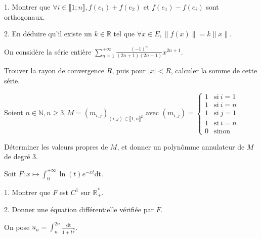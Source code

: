 \vspace{5pt}
1. Montrer que $\forall i \in \llbracket 1; n \rrbracket, f(e_1) + f(e_2)$ et $f(e_1) - f(e_i)$ sont orthogonaux.

\vspace{5pt}
2. En déduire qu'il existe un $k \in \mathbb{R}$ tel que $\forall x \in E, \| f(x) \| = k \|x\|$.



\subetoiles



\noindent On considère la série entière 
$\displaystyle \sum_{n=1}^{+\infty} \frac {(-1)^n} {(2n+1)(2n-1)} x^{2n+1}$.

\vspace{5pt}
\noindent Trouver la rayon de convergence $R$, puis pour $|x| < R$, calculer la somme de cette série.



\subetoiles



\noindent Soient $n \in \mathbb{N}, n\geqslant 3, M = (m_{i,j})_{(i,j) \in \llbracket 1;n \rrbracket^2}$
avec $(m_{i,j}) = 
\begin{cases}
  1 & \mathrm{si} \ i = 1 \\
  1 & \mathrm{si} \ i = n \\
  1 & \mathrm{si} \ j = 1 \\
  1 & \mathrm{si} \ i = n \\
  0 & \mathrm{sinon}
\end{cases}
$

\vspace{5pt}
\noindent Déterminer les valeurs propres de $M$, et donner un polynômme annulateur de $M$ de degré 3.



\subetoiles
\columnbreak



\noindent Soit $\displaystyle F : x \mapsto \int_{0}^{+\infty} \ln(t)e^{-xt}\mathrm{dt}$.

\vspace{5pt}
1. Montrer que $F$ est $C^1$ sur $\mathbb{R}^*_+$.

\vspace{5pt}
2. Donner une équation différentielle vérifiée par $F$.



\subetoiles



\noindent On pose $\displaystyle u_n = \int_{n}^{2n} \frac {\mathrm{dt}} {1 + t^\frac {3} {2}}$.

